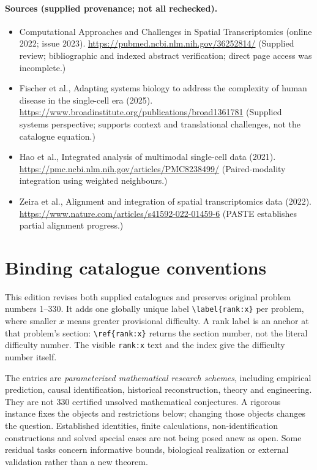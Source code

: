 \documentclass[11pt]{article}
\begin{document}
\paragraph{Sources (supplied provenance; not all rechecked).}
\begin{itemize}
\item Computational Approaches and Challenges in Spatial Transcriptomics (online 2022; issue 2023). \url{https://pubmed.ncbi.nlm.nih.gov/36252814/} (Supplied review; bibliographic and indexed abstract verification; direct page access was incomplete.)
\item Fischer et al., Adapting systems biology to address the complexity of human disease in the single-cell era (2025). \url{https://www.broadinstitute.org/publications/broad1361781} (Supplied systems perspective; supports context and translational challenges, not the catalogue equation.)
\item Hao et al., Integrated analysis of multimodal single-cell data (2021). \url{https://pmc.ncbi.nlm.nih.gov/articles/PMC8238499/} (Paired-modality integration using weighted neighbours.)
\item Zeira et al., Alignment and integration of spatial transcriptomics data (2022). \url{https://www.nature.com/articles/s41592-022-01459-6} (PASTE establishes partial alignment progress.)
\end{itemize}


\section*{Binding catalogue conventions}
This edition revises both supplied catalogues and preserves original problem numbers 1--330. It adds one globally unique label \verb|\label{rank:x}| per problem, where smaller $x$ means greater provisional difficulty. A rank label is an anchor at that problem's section: \verb|\ref{rank:x}| returns the section number, not the literal difficulty number. The visible \texttt{rank:x} text and the index give the difficulty number itself.

The entries are \emph{parameterized mathematical research schemes}, including empirical prediction, causal identification, historical reconstruction, theory and engineering. They are not 330 certified unsolved mathematical conjectures. A rigorous instance fixes the objects and restrictions below; changing those objects changes the question. Established identities, finite calculations, non-identification constructions and solved special cases are not being posed anew as open. Some residual tasks concern informative bounds, biological realization or external validation rather than a new theorem.
\end{document}
